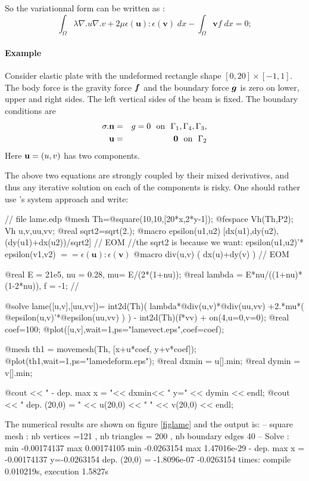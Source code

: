 \documentclass[a4paper,twoside,12pt]{book}
\def\vec#1{\mbox{\boldmath $#1$}}
\begin{document}
So the variationnal form can be written as :
$$
 \int_{\Omega} \lambda \nabla.u   \nabla.v  + 2 \mu \epsilon(\mathbf{u}):\epsilon(\mathbf{v}) \; dx - \int_{\Omega}  \mathbf{v} f  \;dx  =0;
$$
\paragraph{Example}  Consider  elastic plate with the undeformed rectangle shape
$[0,20]\times [-1,1]$.
The body force is the gravity force $\vec f$ and the
boundary force $\vec g$ is zero on lower, upper and right sides.
The left vertical sides of the beam is fixed.
The boundary conditions are
\begin{eqnarray*}
     \sigma . {\bf n}  &=& g = 0    ~~\hbox{on}~~\Gamma_1, \Gamma_4, \Gamma_3, \\
      {\bf u} &=& \mathbf{0} ~~\hbox{on}~~\Gamma_2
 \end{eqnarray*}
Here ${\bf u}=(u,v) $ has two components.\bigskip

The above two equations are strongly coupled by their mixed
derivatives, and thus any iterative solution on each of the
components is risky. One should rather use \freefempp's system
approach and write:

\begin{example}\label{lame.edp}
\bFF
// file lame.edp
@mesh Th=@square(10,10,[20*x,2*y-1]);
@fespace Vh(Th,P2);
Vh u,v,uu,vv;
@real sqrt2=sqrt(2.);
@macro epsilon(u1,u2)  [dx(u1),dy(u2),(dy(u1)+dx(u2))/sqrt2] // EOM  
//the sqrt2 is because we want: epsilon(u1,u2)'* epsilon(v1,v2) $==  \epsilon(\bm{u}): \epsilon(\bm{v})$
@macro div(u,v) ( dx(u)+dy(v) ) // EOM


@real E = 21e5, nu = 0.28, mu= E/(2*(1+nu));
@real lambda = E*nu/((1+nu)*(1-2*nu)), f = -1; //

@solve lame([u,v],[uu,vv])= int2d(Th)(
        lambda*@div(u,v)*@div(uu,vv)
        +2.*mu*( @epsilon(u,v)'*@epsilon(uu,vv) ) )	
        - int2d(Th)(f*vv)
        + on(4,u=0,v=0);
@real coef=100;
@plot([u,v],wait=1,ps="lamevect.eps",coef=coef);

@mesh th1 = movemesh(Th, [x+u*coef, y+v*coef]);
@plot(th1,wait=1,ps="lamedeform.eps");
@real dxmin  = u[].min;
@real dymin  = v[].min;

@cout << " - dep.  max   x = "<< dxmin<< " y=" << dymin << endl;
@cout << "   dep.  (20,0)  = " << u(20,0) << " " << v(20,0) << endl;
\eFF
\end{example}

The numerical results are shown on figure \ref{figlame} and the output is:
\bFF
 -- square mesh : nb vertices  =121 ,  nb triangles = 200 ,  nb boundary edges 40
 -- Solve :           min -0.00174137  max 0.00174105
          min -0.0263154  max 1.47016e-29
 - dep.  max   x = -0.00174137 y=-0.0263154
   dep.  (20,0)  = -1.8096e-07 -0.0263154
times: compile 0.010219s, execution 1.5827s
\eFF
\end{document}

